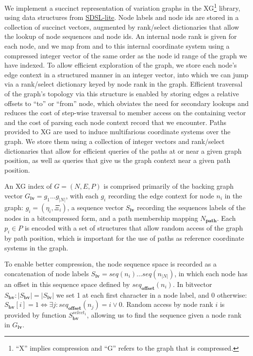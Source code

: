 We implement a succinct representation of variation graphs in the XG\footnote{``X'' implies compression and ``G'' refers to the graph that is compressed.} library, using data structures from \href{https://github.com/simongog/sdsl-lite}{SDSL-lite}.
Node labels and node ids are stored in a collection of succinct vectors, augmented by rank/select dictionaries that allow the lookup of node sequences and node ids.
An internal node rank is given for each node, and we map from and to this internal coordinate system using a compressed integer vector of the same order as the node id range of the graph we have indexed.
To allow efficient exploration of the graph, we store each node's edge context in a structured manner in an integer vector, into which we can jump via a rank/select dictionary keyed by node rank in the graph.
Efficient traversal of the graph's topology via this structure is enabled by storing edges a relative offsets to ``to'' or ``from'' node, which obviates the need for secondary lookups and reduces the cost of step-wise traversal to member access on the containing vector and the cost of parsing each node context record that we encounter.
Paths provided to XG are used to induce multifarious coordinate systems over the graph. 
We store them using a collection of integer vectors and rank/select dictionaries that allow for efficient queries of the paths at or near a given graph position, as well as queries that give us the graph context near a given path position.

An XG index of $G = (N, E, P)$ is comprised primarily of the backing graph vector $G_\textbf{iv} = g_1 \ldots g_{|N|}$, with each $g_i$ recording the edge context for node $n_i$ in the graph: $g_i = ( \eta_i, \Xi_i)$, a sequence vector $S_\textbf{iv}$ recording the sequences labels of the nodes in a bitcompressed form, and a path membership mapping $N_\textbf{path}$.
Each $p_i \in P$ is encoded with a set of structures that allow random access of the graph by path position, which is important for the use of paths as reference coordinate systems in the graph.

To enable better compression, the node sequence space is recorded as a concatenation of node labels $S_\textbf{iv} = seq(n_i) \ldots seq(n_{|N|})$, in which each node has an offset in this sequence space defined by $seq_\textbf{offset}(n_i)$.
In bitvector $S_\textbf{bv} : |S_\textbf{bv}| = |S_\textbf{iv}|$ we set 1 at each first character in a node label, and 0 otherwise: $S_\textbf{bv}[i] = 1 \iff \exists j : seq_\textbf{offset}(n_j) = i \lor 0$.
Random access by node rank $i$ is provided by function $S_\textbf{bv}^{select_1}$, allowing us to find the sequence given a node rank in $G_\textbf{iv}$.

